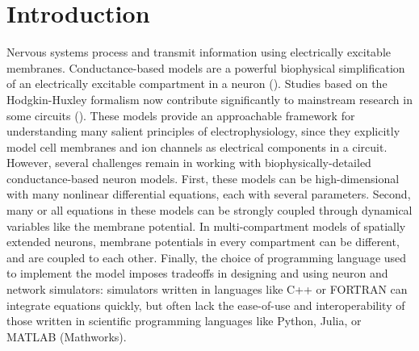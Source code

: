 \documentclass{frontiersSCNS} %
\begin{document}

\section{Introduction}
\label{sec:intro}

Nervous systems process and transmit information using electrically excitable membranes. Conductance-based models are a powerful biophysical simplification of an electrically excitable compartment in a neuron (\cite{hodgkinQuantitativeDescriptionMembrane1952}). Studies based on the Hodgkin-Huxley formalism now contribute significantly to mainstream research in some circuits (\cite{marderTheoryMotion1995, prinzComputationalApproachesNeuronal2010, prinzInsightsModelsRhythmic2006}). These models provide an approachable framework for understanding many salient principles of electrophysiology, since they explicitly model cell membranes and ion channels as electrical components in a circuit. However, several challenges remain in working with biophysically-detailed conductance-based neuron models. First, these models can be high-dimensional with many nonlinear differential equations, each with several parameters. Second, many or all equations in these models can be strongly coupled through dynamical variables like the membrane potential.  In multi-compartment models of spatially extended neurons, membrane potentials in every compartment can be different, and are coupled to each other. Finally, the choice of programming language used to implement the model imposes tradeoffs in designing and using neuron and network simulators: simulators written in languages like C++ or FORTRAN can integrate equations quickly, but often lack the ease-of-use and interoperability of those written in scientific programming languages like Python, Julia, or MATLAB (Mathworks).
\end{document}
